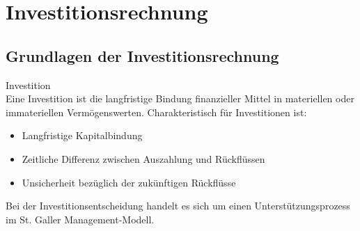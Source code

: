 \section{Investitionsrechnung}

\subsection{Grundlagen der Investitionsrechnung}

\begin{definition}{Investition}\\
Eine Investition ist die langfristige Bindung finanzieller Mittel in materiellen oder immateriellen Vermögenswerten. Charakteristisch für Investitionen ist:
\begin{itemize}
    \item Langfristige Kapitalbindung
    \item Zeitliche Differenz zwischen Auszahlung und Rückflüssen
    \item Unsicherheit bezüglich der zukünftigen Rückflüsse
\end{itemize}

Bei der Investitionsentscheidung handelt es sich um einen Unterstützungsprozess im St. Galler Management-Modell.
\end{definition}

